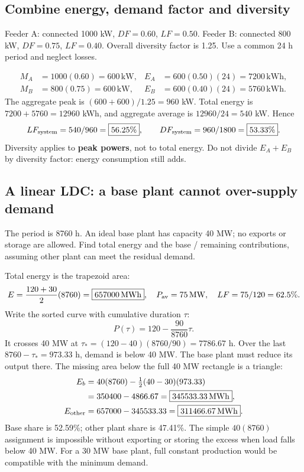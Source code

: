 \documentclass[11pt,a4paper]{article}
\newenvironment{Worked}[1]{\begin{tcolorbox}[breakable=false,colback=white,colframe=teal,colbacktitle=pale,coltitle=ink,title={#1}]}{\end{tcolorbox}}
\begin{document}
\subsection{Combine energy, demand factor and diversity}
\begin{Worked}{Two feeders with different loads and peaks}
Feeder A: connected 1000 kW, $DF=0.60$, $LF=0.50$. Feeder B: connected 800 kW, $DF=0.75$, $LF=0.40$. Overall diversity factor is 1.25. Use a common 24 h period and neglect losses.
\end{Worked}
\begin{align*}
M_A&=1000(0.60)=600\,\mathrm{kW},& E_A&=600(0.50)(24)=7200\,\mathrm{kWh},\\
M_B&=800(0.75)=600\,\mathrm{kW},& E_B&=600(0.40)(24)=5760\,\mathrm{kWh}.
\end{align*}
The aggregate peak is $(600+600)/1.25=960$ kW. Total energy is $7200+5760=12960$ kWh, and aggregate average is $12960/24=540$ kW. Hence
\[
LF_{\rm system}=540/960=\boxed{56.25\%},\qquad
DF_{\rm system}=960/1800=\boxed{53.33\%}.
\]
Diversity applies to \textbf{peak powers}, not to total energy. Do not divide $E_A+E_B$ by diversity factor: energy consumption still adds.

\subsection{A linear LDC: a base plant cannot over-supply demand}\label{ldcexample}
\begin{Worked}{Data: annual LDC falls linearly from 120 MW to 30 MW}
The period is 8760 h. An ideal base plant has capacity 40 MW; no exports or storage are allowed. Find total energy and the base / remaining contributions, assuming other plant can meet the residual demand.
\end{Worked}
Total energy is the trapezoid area:
\[
E=\frac{120+30}{2}(8760)=\boxed{657000\,\mathrm{MWh}},
\quad P_{\rm av}=75\,\mathrm{MW},\quad LF=75/120=62.5\%.
\]
Write the sorted curve with cumulative duration $\tau$:
\[
P(\tau)=120-\frac{90}{8760}\tau.
\]
It crosses 40 MW at $\tau_*=(120-40)(8760/90)=7786.67$ h. Over the last $8760-\tau_*=973.33$ h, demand is below 40 MW. The base plant must reduce its output there. The missing area below the full 40 MW rectangle is a triangle:
\begin{align*}
E_b&=40(8760)-\tfrac12(40-30)(973.33)\\
&=350400-4866.67=\boxed{345533.33\,\mathrm{MWh}},\\
E_{\rm other}&=657000-345533.33=\boxed{311466.67\,\mathrm{MWh}}.
\end{align*}
Base share is 52.59\%; other plant share is 47.41\%. The simple $40(8760)$ assignment is impossible without exporting or storing the excess when load falls below 40 MW. For a 30 MW base plant, full constant production would be compatible with the minimum demand.
\end{document}
